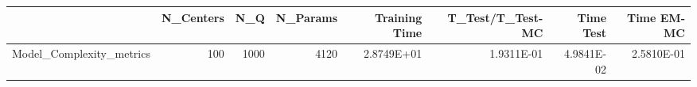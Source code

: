 \begin{tabular}{lrrrrrrr}
\toprule
{} &  N\_Centers &   N\_Q &  N\_Params &  Training Time &  T\_Test/T\_Test-MC &  Time Test &  Time EM-MC \\
\midrule
Model\_Complexity\_metrics &        100 &  1000 &      4120 &     2.8749E+01 &        1.9311E-01 & 4.9841E-02 &  2.5810E-01 \\
\bottomrule
\end{tabular}
